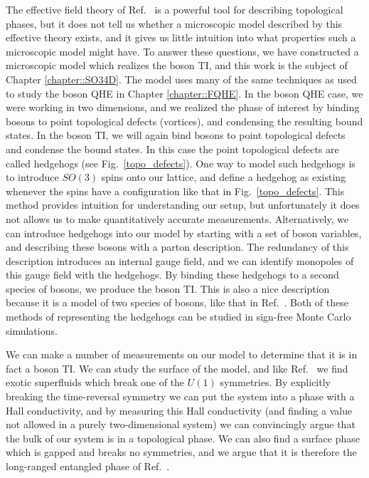 The effective field theory of Ref.~\cite{SenthilVishwanath} is a powerful tool for describing topological phases, but it does not tell us whether a microscopic model described by this effective theory exists, and it gives us little intuition into what properties such a microscopic model might have. To answer these questions, we have constructed a microscopic model which realizes the boson TI, and this work is the subject of Chapter \ref{chapter::SO34D}.
The model uses many of the same techniques as used to study the boson QHE in Chapter \ref{chapter::FQHE}. In the boson QHE case, we were working in two dimensions, and we realized the phase of interest by binding bosons to point topological defects (vortices), and condensing the resulting bound states. In the boson TI, we will again bind bosons to point topological defects and condense the bound states. In this case the point topological defects are called hedgehogs (see Fig.~\ref{topo_defects}). One way to model such hedgehogs is to introduce $SO(3)$ spins onto our lattice, and define a hedgehog as existing whenever the spins have a configuration like that in Fig.~\ref{topo_defects}. This method provides intuition for understanding our setup, but unfortunately it does not allows us to make quantitatively accurate measurements. Alternatively, we can introduce hedgehogs into our model by starting with a set of boson variables, and describing these bosons with a parton description. The redundancy of this description introduces an internal gauge field, and we can identify monopoles of this gauge field with the hedgehogs. By binding these hedgehogs to a second species of bosons, we produce the boson TI. This is also a nice description because it is a model of two species of bosons, like that in Ref.~\cite{SenthilVishwanath}. Both of these methods of representing the hedgehogs can be studied in sign-free Monte Carlo simulations.

We can make a number of measurements on our model to determine that it is in fact a boson TI. We can study the surface of the model, and like Ref.~\cite{SenthilVishwanath} we find exotic superfluids which break one of the $U(1)$ symmetries. By explicitly breaking the time-reversal symmetry we can put the system into a phase with a Hall conductivity, and by measuring this Hall conductivity (and finding a value not allowed in a purely two-dimensional system) we can convincingly argue that the bulk of our system is in a topological phase. We can also find a surface phase which is gapped and breaks no symmetries, and we argue that it is therefore the long-ranged entangled phase of Ref.~\cite{SenthilVishwanath}.

